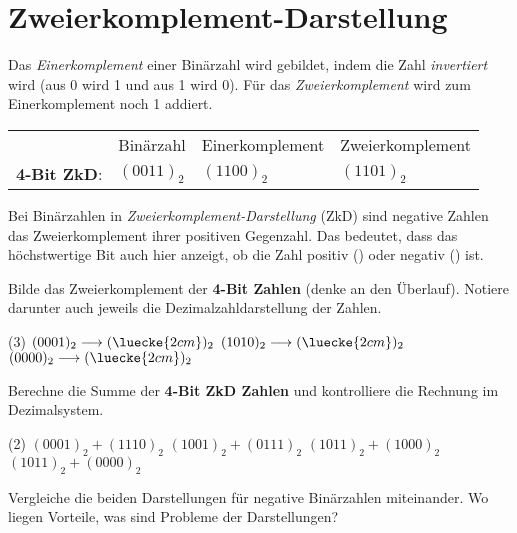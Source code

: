 \documentclass[9pt, a4paper]{scrartcl}
\begin{document}
\section*{Zweierkomplement-Darstellung}
\begin{infobox}
Das \emph{Einerkomplement} einer Binärzahl wird gebildet, indem die Zahl \emph{invertiert} wird (aus 0 wird 1 und aus 1 wird 0). Für das \emph{Zweierkomplement} wird zum Einerkomplement noch 1 addiert.

\begin{tabularx}{\textwidth}{XXXX}
	 & Binärzahl & Einerkomplement & Zweierkomplement \\
	\textbf{4-Bit ZkD}: & $(0011)_2$ & $(1100)_2$ & $(1101)_2$
\end{tabularx}

Bei Binärzahlen in \emph{Zweierkomplement-Darstellung} (ZkD) sind negative Zahlen das Zweierkomplement ihrer positiven Gegenzahl. Das bedeutet, dass das höchstwertige Bit auch hier anzeigt, ob die Zahl positiv () oder negativ () ist.
\end{infobox}

\begin{aufgabe}
	Bilde das Zweierkomplement der \textbf{4-Bit Zahlen} (denke an den Überlauf). Notiere darunter auch jeweils die Dezimalzahldarstellung der Zahlen.
	
	\begin{tasks}(3)
		\task $(0001)_2 \longrightarrow (\luecke{2cm})_2$
		\task $(1010)_2 \longrightarrow (\luecke{2cm})_2$
		\task $(0000)_2 \longrightarrow (\luecke{2cm})_2$
	\end{tasks}	
\end{aufgabe}

\begin{aufgabe}
	Berechne die Summe der \textbf{4-Bit ZkD Zahlen} und kontrolliere die Rechnung im Dezimalsystem.
	
	\begin{tasks}(2)
		\task $(0001)_2 + (1110)_2$
		\task $(1001)_2 + (0111)_2$
		\task $(1011)_2 + (1000)_2$
		\task $(1011)_2 + (0000)_2$
	\end{tasks}
\end{aufgabe}

\begin{aufgabe}
	Vergleiche die beiden Darstellungen für negative Binärzahlen miteinander. Wo liegen Vorteile, was sind Probleme der Darstellungen?
\end{aufgabe}
\end{document}

